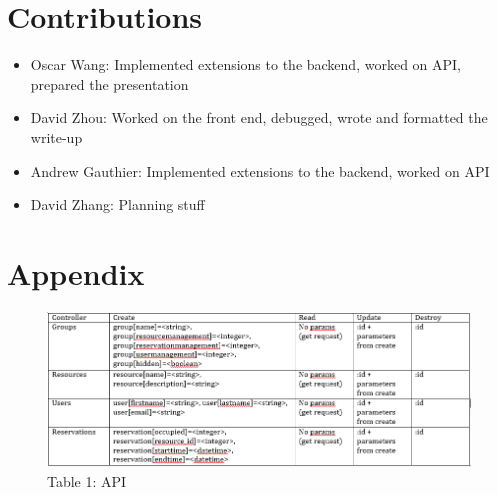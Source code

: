 \documentclass{article}
\begin{document}
\section{Contributions}
\begin{itemize}
\item{Oscar Wang: Implemented extensions to the backend, worked on API, prepared the presentation}
\item{David Zhou: Worked on the front end, debugged, wrote and formatted the write-up}
\item{Andrew Gauthier: Implemented extensions to the backend, worked on API}
\item{David Zhang: Planning stuff}
\end{itemize}
\section{Appendix}

\begin{figure}[h]
\centering
\includegraphics[width=6in]{table}
\caption{Table 1: API}
\end{figure}
\end{document}
